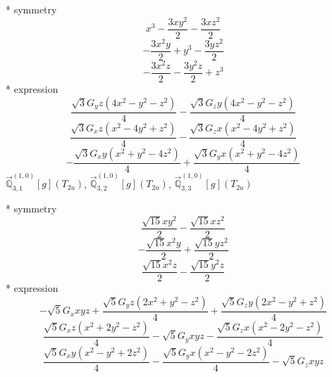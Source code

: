 \documentclass[fleqn,8pt]{jsarticle}
\begin{document}
\noindent\quad ** symmetry
\begin{dmath*}
x^{3} - \frac{3 x y^{2}}{2} - \frac{3 x z^{2}}{2}
\end{dmath*}
\begin{dmath*}
- \frac{3 x^{2} y}{2} + y^{3} - \frac{3 y z^{2}}{2}
\end{dmath*}
\begin{dmath*}
- \frac{3 x^{2} z}{2} - \frac{3 y^{2} z}{2} + z^{3}
\end{dmath*}
\noindent\quad ** expression
\begin{dmath*}
\frac{\sqrt{3} G_{y} z \left(4 x^{2} - y^{2} - z^{2}\right)}{4} - \frac{\sqrt{3} G_{z} y \left(4 x^{2} - y^{2} - z^{2}\right)}{4}
\end{dmath*}
\begin{dmath*}
\frac{\sqrt{3} G_{x} z \left(x^{2} - 4 y^{2} + z^{2}\right)}{4} - \frac{\sqrt{3} G_{z} x \left(x^{2} - 4 y^{2} + z^{2}\right)}{4}
\end{dmath*}
\begin{dmath*}
- \frac{\sqrt{3} G_{x} y \left(x^{2} + y^{2} - 4 z^{2}\right)}{4} + \frac{\sqrt{3} G_{y} x \left(x^{2} + y^{2} - 4 z^{2}\right)}{4}
\end{dmath*}
\noindent\quad $\vec{\mathbb{Q}}_{3,1}^{(1,0)}[g](T_{2u})$, $\vec{\mathbb{Q}}_{3,2}^{(1,0)}[g](T_{2u})$, $\vec{\mathbb{Q}}_{3,3}^{(1,0)}[g](T_{2u})$

\noindent\quad ** symmetry
\begin{dmath*}
\frac{\sqrt{15} x y^{2}}{2} - \frac{\sqrt{15} x z^{2}}{2}
\end{dmath*}
\begin{dmath*}
- \frac{\sqrt{15} x^{2} y}{2} + \frac{\sqrt{15} y z^{2}}{2}
\end{dmath*}
\begin{dmath*}
\frac{\sqrt{15} x^{2} z}{2} - \frac{\sqrt{15} y^{2} z}{2}
\end{dmath*}
\noindent\quad ** expression
\begin{dmath*}
- \sqrt{5} G_{x} x y z + \frac{\sqrt{5} G_{y} z \left(2 x^{2} + y^{2} - z^{2}\right)}{4} + \frac{\sqrt{5} G_{z} y \left(2 x^{2} - y^{2} + z^{2}\right)}{4}
\end{dmath*}
\begin{dmath*}
\frac{\sqrt{5} G_{x} z \left(x^{2} + 2 y^{2} - z^{2}\right)}{4} - \sqrt{5} G_{y} x y z - \frac{\sqrt{5} G_{z} x \left(x^{2} - 2 y^{2} - z^{2}\right)}{4}
\end{dmath*}
\begin{dmath*}
\frac{\sqrt{5} G_{x} y \left(x^{2} - y^{2} + 2 z^{2}\right)}{4} - \frac{\sqrt{5} G_{y} x \left(x^{2} - y^{2} - 2 z^{2}\right)}{4} - \sqrt{5} G_{z} x y z
\end{dmath*}
\end{document}
